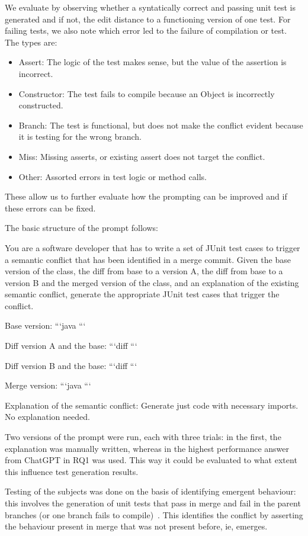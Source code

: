 We evaluate by observing whether a syntatically correct and passing unit test is generated and if not, the edit distance to a functioning version of one test. For failing tests, we also note which error led to the failure of compilation or test. The types are:
\begin{itemize}
  \item Assert: The logic of the test makes sense, but the value of the assertion is incorrect.
  \item Constructor: The test fails to compile because an Object is incorrectly constructed.
  \item Branch: The test is functional, but does not make the conflict evident because it is testing for the wrong branch.
  \item Miss: Missing asserts, or existing assert does not target the conflict.
  \item Other: Assorted errors in test logic or method calls.
\end{itemize}
These allow us to further evaluate how the prompting can be improved and if these errors can be fixed.

The basic structure of the prompt follows:
\begin{prompt}
You are a software developer that has to write a set of JUnit test cases to trigger a semantic conflict that has been identified in a merge commit.
Given the base version of the class, the diff from base to a version A, the diff from base to a version B and the merged version of the class, and an explanation of the existing semantic conflict, generate the appropriate JUnit test cases that trigger the conflict.

Base version:
```java
```

Diff version A and the base:
```diff
```

Diff version B and the base:
```diff
```

Merge version:
```java
```

Explanation of the semantic conflict:
Generate just code with necessary imports. No explanation needed.
\end{prompt}
Two versions of the prompt were run, each with three trials: in the first, the explanation was manually written, whereas in the highest performance answer from ChatGPT in RQ1 was used.
This way it could be evaluated to what extent this influence test generation results.

Testing of the subjects was done on the basis of identifying emergent behaviour: this involves the generation of unit tests that
pass in merge and fail in the parent branches (or one branch fails to compile)~\citep{kn:nuno}. This identifies the conflict by
asserting the behaviour present in merge that was not present before, ie, emerges.

